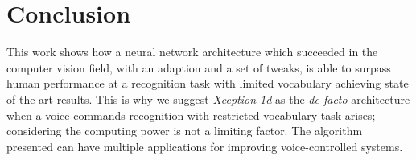 \documentclass[review]{elsarticle}
\begin{document}
\begin{table}[h!]
\begin{subtable}{1\textwidth}
\end{subtable}
\bigskip
\begin{subtable}{1\textwidth}
\caption{Results for version 2 of the data set}
\end{subtable}
\end{table}




\section{Conclusion} \label{sec:conclusion}
This work shows how a neural network architecture which succeeded in the computer vision field, with an adaption and a set of tweaks, is able to surpass human performance at a recognition task with limited vocabulary achieving state of the art results. This is why we suggest \textit{Xception-1d} as the \textit{de facto} architecture when a voice commands recognition with restricted vocabulary task arises; considering the computing power is not a limiting factor. The algorithm presented can have multiple  applications for improving voice-controlled systems. 
\end{document}
